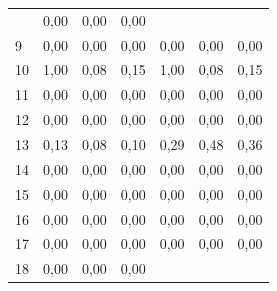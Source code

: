 \begin{table}[ht]
\begin{tabular}{l|c|c|c|c|c|c}
              & 0,00                                   & 0,00                                      & 0,00
        \\
        9     & 0,00                                   & 0,00                                      & 0,00
              & 0,00                                   & 0,00                                      & 0,00
        \\
        10    & 1,00                                   & 0,08                                      & 0,15
              & 1,00                                   & 0,08                                      & 0,15
        \\
        11    & 0,00                                   & 0,00                                      & 0,00
              & 0,00                                   & 0,00                                      & 0,00
        \\
        12    & 0,00                                   & 0,00                                      & 0,00
              & 0,00                                   & 0,00                                      & 0,00
        \\
        13    & 0,13                                   & 0,08                                      & 0,10
              & 0,29                                   & 0,48                                      & 0,36
        \\
        14    & 0,00                                   & 0,00                                      & 0,00
              & 0,00                                   & 0,00                                      & 0,00
        \\
        15    & 0,00                                   & 0,00                                      & 0,00
              & 0,00                                   & 0,00                                      & 0,00
        \\
        16    & 0,00                                   & 0,00                                      & 0,00
              & 0,00                                   & 0,00                                      & 0,00
        \\
        17    & 0,00                                   & 0,00                                      & 0,00
              & 0,00                                   & 0,00                                      & 0,00
        \\
        18    & 0,00                                   & 0,00                                      & 0,00

\end{tabular}
\end{table}
